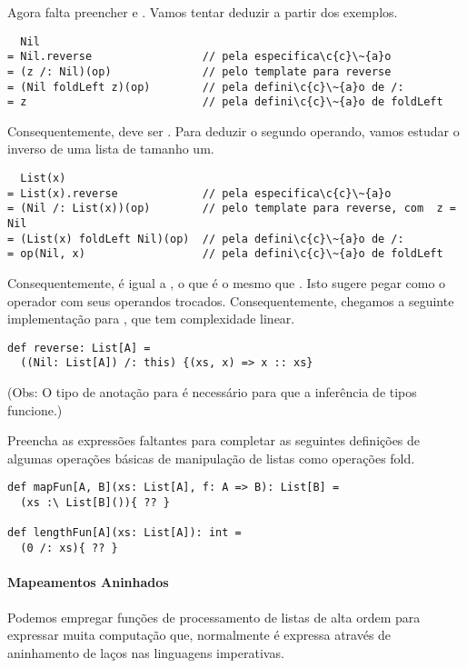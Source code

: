 Agora falta preencher  e . Vamos tentar deduzir a partir dos exemplos.
\begin{lstlisting}
  Nil
= Nil.reverse                 // pela especifica\c{c}\~{a}o 
= (z /: Nil)(op)              // pelo template para reverse
= (Nil foldLeft z)(op)        // pela defini\c{c}\~{a}o de /:
= z                           // pela defini\c{c}\~{a}o de foldLeft
\end{lstlisting}
Consequentemente,  deve ser . Para deduzir o segundo operando, vamos estudar
o inverso de uma lista de tamanho um.
\begin{lstlisting}
  List(x)
= List(x).reverse             // pela especifica\c{c}\~{a}o 
= (Nil /: List(x))(op)        // pelo template para reverse, com  z = Nil
= (List(x) foldLeft Nil)(op)  // pela defini\c{c}\~{a}o de /:
= op(Nil, x)                  // pela defini\c{c}\~{a}o de foldLeft
\end{lstlisting}
Consequentemente,  é igual a , o que é o mesmo que .
Isto sugere pegar como  o operador \code{::} com seus operandos trocados. Consequentemente,
chegamos a seguinte implementação para , que tem complexidade linear.
\begin{lstlisting}
def reverse: List[A] =
  ((Nil: List[A]) /: this) {(xs, x) => x :: xs}
\end{lstlisting}
(Obs: O tipo de anotação para  é necessário para que a inferência de tipos funcione.)

\begin{exercise} Preencha as expressões faltantes para completar as seguintes definições de 
algumas operações básicas de manipulação de listas como operações fold. 
\begin{lstlisting}
def mapFun[A, B](xs: List[A], f: A => B): List[B] =
  (xs :\ List[B]()){ ?? }

def lengthFun[A](xs: List[A]): int =
  (0 /: xs){ ?? }
\end{lstlisting}
\end{exercise}


\paragraph{Mapeamentos Aninhados}

Podemos empregar funções de processamento de listas de alta ordem para expressar muita
computação que, normalmente é expressa através de aninhamento de laços nas linguagens imperativas.


